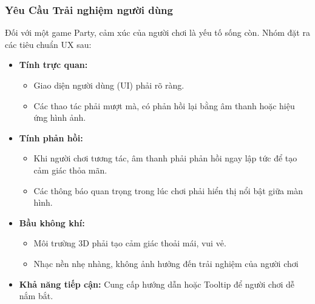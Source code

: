\begin{frame}
\frametitle{Yêu Cầu Trải nghiệm người dùng}

Đối với một game Party, cảm xúc của người chơi là yếu tố sống còn. Nhóm đặt ra các tiêu chuẩn UX sau:

\begin{itemize}
    \item \textbf{Tính trực quan:}
        \begin{itemize}
            \item Giao diện người dùng (UI) phải rõ ràng.
            \item Các thao tác phải mượt mà, có phản hồi lại bằng âm thanh hoặc hiệu ứng hình ảnh.
        \end{itemize}
    \item \textbf{Tính phản hồi:}
        \begin{itemize}
            \item Khi người chơi tương tác, âm thanh phải phản hồi ngay lập tức để tạo cảm giác thỏa mãn.
            \item Các thông báo quan trọng trong lúc chơi phải hiển thị nổi bật giữa màn hình.
        \end{itemize}
    \item \textbf{Bầu không khí:}
        \begin{itemize}
            \item Môi trường 3D phải tạo cảm giác thoải mái, vui vẻ.
            \item Nhạc nền nhẹ nhàng, không ảnh hưởng đến trải nghiệm của người chơi
        \end{itemize}
    \item \textbf{Khả năng tiếp cận:} Cung cấp hướng dẫn hoặc Tooltip để người chơi dễ nắm bắt.
\end{itemize}
\end{frame}